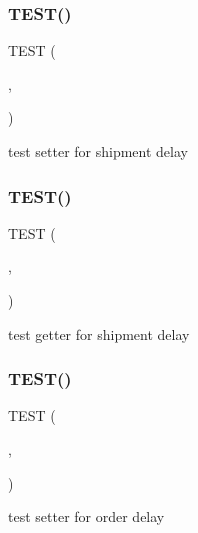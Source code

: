 \subsubsection{\texorpdfstring{T\+E\+S\+T()}{TEST()}\hspace{0.1cm}{\footnotesize\ttfamily [1/54]}}
{\footnotesize\ttfamily T\+E\+ST (\begin{DoxyParamCaption}\item[{game\+Test}]{,  }\item[{set\+Shipment\+Delay\+Test}]{ }\end{DoxyParamCaption})}

test setter for shipment delay \mbox{\label{group__group2_gaa834d2289bc3bdebf897f2a5edc8a17d}} 
\subsubsection{\texorpdfstring{T\+E\+S\+T()}{TEST()}\hspace{0.1cm}{\footnotesize\ttfamily [2/54]}}
{\footnotesize\ttfamily T\+E\+ST (\begin{DoxyParamCaption}\item[{game\+Test}]{,  }\item[{get\+Shipment\+Delay\+Test}]{ }\end{DoxyParamCaption})}

test getter for shipment delay \mbox{\label{group__group2_gacba9723d0ad8708e8df11dfcd8018a52}} 
\subsubsection{\texorpdfstring{T\+E\+S\+T()}{TEST()}\hspace{0.1cm}{\footnotesize\ttfamily [3/54]}}
{\footnotesize\ttfamily T\+E\+ST (\begin{DoxyParamCaption}\item[{game\+Test}]{,  }\item[{set\+Order\+Delay\+Test}]{ }\end{DoxyParamCaption})}

test setter for order delay \mbox{\label{group__group2_ga2a35bbb3146e1ab9eedb355942704a56}} 
